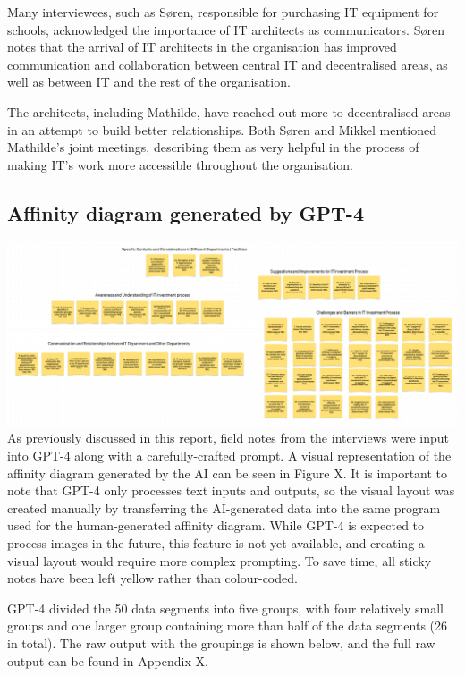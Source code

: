 \documentclass[
]{book}
\begin{document}
Many interviewees, such as Søren, responsible for purchasing IT equipment for schools, acknowledged the importance of IT architects as communicators. Søren notes that the arrival of IT architects in the organisation has improved communication and collaboration between central IT and decentralised areas, as well as between IT and the rest of the organisation.

The architects, including Mathilde, have reached out more to decentralised areas in an attempt to build better relationships. Both Søren and Mikkel mentioned Mathilde's joint meetings, describing them as very helpful in the process of making IT's work more accessible throughout the organisation.

\hypertarget{affinity-diagram-generated-by-gpt-4}{%
\subsection{Affinity diagram generated by GPT-4}\label{affinity-diagram-generated-by-gpt-4}}

\hfill\break

\includegraphics{a79e7f23a4167279dd1e3af32e4313da.png} As previously discussed in this report, field notes from the interviews were input into GPT-4 along with a carefully-crafted prompt. A visual representation of the affinity diagram generated by the AI can be seen in Figure X. It is important to note that GPT-4 only processes text inputs and outputs, so the visual layout was created manually by transferring the AI-generated data into the same program used for the human-generated affinity diagram. While GPT-4 is expected to process images in the future, this feature is not yet available, and creating a visual layout would require more complex prompting. To save time, all sticky notes have been left yellow rather than colour-coded.

GPT-4 divided the 50 data segments into five groups, with four relatively small groups and one larger group containing more than half of the data segments (26 in total). The raw output with the groupings is shown below, and the full raw output can be found in Appendix X.
\end{document}

